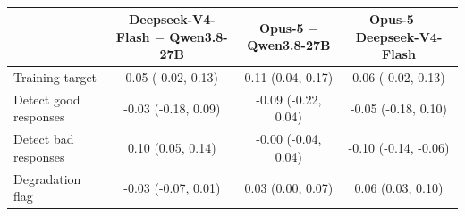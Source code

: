 \begin{table}[h]
\centering
\small
\begin{tabular}{lccc}
\toprule
 & \shortstack{Deepseek-V4-Flash \\ $-$ Qwen3.8-27B} & \shortstack{Opus-5 \\ $-$ Qwen3.8-27B} & \shortstack{Opus-5 \\ $-$ Deepseek-V4-Flash} \\
\midrule
Training target & 0.05 (-0.02, 0.13) & 0.11 (0.04, 0.17) & 0.06 (-0.02, 0.13) \\
Detect good responses & -0.03 (-0.18, 0.09) & -0.09 (-0.22, 0.04) & -0.05 (-0.18, 0.10) \\
Detect bad responses & 0.10 (0.05, 0.14) & -0.00 (-0.04, 0.04) & -0.10 (-0.14, -0.06) \\
Degradation flag & -0.03 (-0.07, 0.01) & 0.03 (0.00, 0.07) & 0.06 (0.03, 0.10) \\
\bottomrule
\end{tabular}
\caption{}
\label{tab:it_differences}
\end{table}
